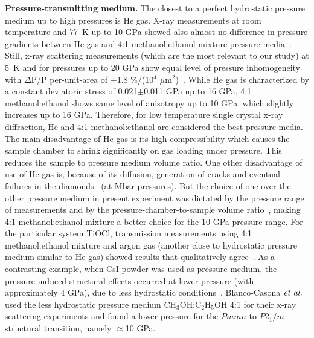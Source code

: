 \documentclass[preprint,superscriptaddress,amsmath,amssymb,aps,prl]{revtex4-1}
\begin{document}
\textbf{Pressure-transmitting medium.} The closest to a perfect hydrostatic pressure medium up to high pressures is He gas. X-ray measurements at room temperature and 77~K up to 10 GPa showed also almost no difference in pressure gradients between He gas and 4:1 methanol:ethanol mixture pressure media~\cite{Tateiwa2009}. Still, x-ray scattering measurements (which are the most relevant to our study) at 5~K and for pressures up to 20 GPa show equal level of pressure inhomogeneity with $\Delta$P/P per-unit-area of $\pm$1.8 $\%$/(10$^4$ $\mu$m$^2$)~\cite{Yejun2010}. While He gas is characterized by a constant deviatoric stress of 0.021$\pm$0.011 GPa up to 16 GPa, 4:1 methanol:ethanol shows same level of anisotropy up to 10 GPa, which slightly increases up to 16 GPa. Therefore, for low temperature single crystal x-ray diffraction, He and 4:1 methanol:ethanol are considered the best pressure media. The main disadvantage of He gas is its high compressibility which causes the sample chamber to shrink significantly on gas loading under pressure. This reduces the sample to pressure medium volume ratio. One other disadvantage of use of He gas is, because of its diffusion, generation of cracks and eventual failures in the diamonds~\cite{Dewaele2006} (at Mbar pressures). But the choice of one over the other pressure medium in present experiment was dictated by the pressure range of measurements and by the pressure-chamber-to-sample volume ratio~\cite{Yejun2010}, making 4:1 methanol:ethanol mixture a better choice for the 10 GPa pressure range. For the particular system TiOCl, transmission measurements using 4:1 methanol:ethanol mixture and argon gas (another close to hydrostatic pressure medium similar to He gas) showed results that qualitatively agree~\cite{Kuntscher2006}. As a contrasting example, when CsI powder was used as pressure medium, the pressure-induced structural effects occurred at lower pressure (with approximately 4 GPa), due to less hydrostatic conditions~\cite{Kuntscher2006}. Blanco-Casona $\emph{et al.}$~\cite{Blanco2009} used the less hydrostatic pressure medium CH$_{3}$OH:C$_{2}$H$_{5}$OH 4:1 for their x-ray scattering experiments and found a lower pressure for the $Pmmn$ to $P2_{1}/m$ structural transition, namely $\approx$10 GPa.
\end{document}
